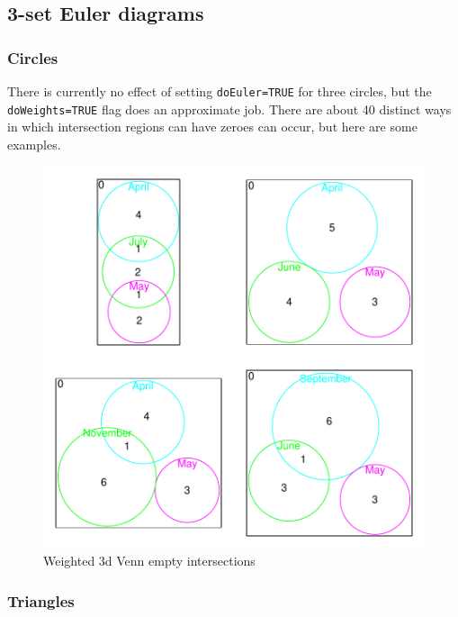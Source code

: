 \documentclass[a4paper]{article}
\begin{document}
\newpage
\subsection{3-set Euler diagrams}

\subsubsection{Circles}
There is currently no effect of setting \texttt{doEuler=TRUE} for three circles,
but the \texttt{doWeights=TRUE} flag does an approximate job. There are about
 40 distinct ways in which intersection regions can have zeroes can occur,
but here are some examples.




\begin{figure}[H]\begin{center}
\includegraphics{Vennfig-pv3wempty}
\caption{Weighted 3d Venn  empty intersections}
\end{center}\end{figure}


\clearpage
\subsubsection{Triangles}
\end{document}
